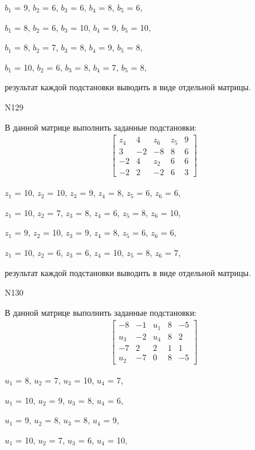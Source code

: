 \documentclass[11pt]{report}
\begin{document}
$b_{1}$ = 9, $b_{2}$ = 6, $b_{3}$ = 6, $b_{4}$ = 8, $b_{5}$ = 6, 

$b_{1}$ = 8, $b_{2}$ = 6, $b_{3}$ = 10, $b_{4}$ = 9, $b_{5}$ = 10, 

$b_{1}$ = 8, $b_{2}$ = 7, $b_{3}$ = 8, $b_{4}$ = 9, $b_{5}$ = 8, 

$b_{1}$ = 10, $b_{2}$ = 6, $b_{3}$ = 8, $b_{4}$ = 7, $b_{5}$ = 8, 

результат каждой подстановки выводить в виде отдельной матрицы.

N129

В данной матрице выполнить заданные подстановки:
\begin{align*}
\left[\begin{matrix}z_{4} & 4 & z_{6} & z_{5} & 9\\3 & -2 & -8 & 8 & 6\\-2 & 4 & z_{2} & 6 & 6\\-2 & 2 & -2 & 6 & 3\end{matrix}\right]
\end{align*}


$z_{1}$ = 10, $z_{2}$ = 10, $z_{3}$ = 9, $z_{4}$ = 8, $z_{5}$ = 6, $z_{6}$ = 6, 

$z_{1}$ = 10, $z_{2}$ = 7, $z_{3}$ = 8, $z_{4}$ = 6, $z_{5}$ = 8, $z_{6}$ = 10, 

$z_{1}$ = 9, $z_{2}$ = 10, $z_{3}$ = 9, $z_{4}$ = 8, $z_{5}$ = 6, $z_{6}$ = 6, 

$z_{1}$ = 10, $z_{2}$ = 6, $z_{3}$ = 6, $z_{4}$ = 10, $z_{5}$ = 8, $z_{6}$ = 7, 

результат каждой подстановки выводить в виде отдельной матрицы.

N130

В данной матрице выполнить заданные подстановки:
\begin{align*}
\left[\begin{matrix}-8 & -1 & u_{1} & 8 & -5\\u_{3} & -2 & u_{4} & 8 & 2\\-7 & 2 & 2 & 1 & 1\\u_{2} & -7 & 0 & 8 & -5\end{matrix}\right]
\end{align*}


$u_{1}$ = 8, $u_{2}$ = 7, $u_{3}$ = 10, $u_{4}$ = 7, 

$u_{1}$ = 10, $u_{2}$ = 9, $u_{3}$ = 8, $u_{4}$ = 6, 

$u_{1}$ = 9, $u_{2}$ = 8, $u_{3}$ = 8, $u_{4}$ = 9, 

$u_{1}$ = 10, $u_{2}$ = 7, $u_{3}$ = 6, $u_{4}$ = 10, 
\end{document}
